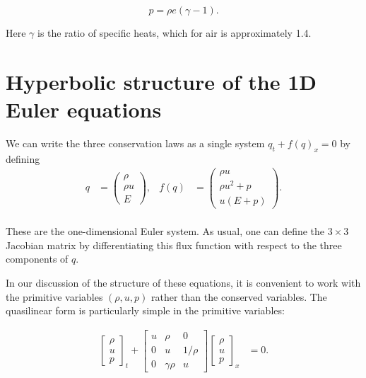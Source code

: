 \documentclass{SIAMbook2016}
\begin{document}
\[p = \rho e (\gamma-1).\]

Here \(\gamma\) is the ratio of specific heats, which for air is
approximately 1.4.

\hypertarget{hyperbolic-structure-of-the-1d-euler-equations}{%
\section{Hyperbolic structure of the 1D Euler
equations}\label{hyperbolic-structure-of-the-1d-euler-equations}}

We can write the three conservation laws as a single system
\(q_t + f(q)_x = 0\) by defining\\
\begin{align}
q & = \begin{pmatrix} \rho \\ \rho u \\ E\end{pmatrix}, & 
f(q) & = \begin{pmatrix} \rho u \\ \rho u^2 + p \\ u(E+p)\end{pmatrix}.
\label{euler_conserved}
\end{align}\\
These are the one-dimensional Euler system. As usual, one can define the
\(3 \times 3\) Jacobian matrix by differentiating this flux function
with respect to the three components of \(q\).

In our discussion of the structure of these equations, it is convenient
to work with the primitive variables \((\rho, u, p)\) rather than the
conserved variables. The quasilinear form is particularly simple in the
primitive variables:

\begin{align} \label{euler_primitive}
\begin{bmatrix} \rho \\ u \\ p \end{bmatrix}_t + 
\begin{bmatrix} u & \rho & 0 \\ 0 & u & 1/\rho \\ 0 & \gamma \rho & u \end{bmatrix} \begin{bmatrix} \rho \\ u \\ p \end{bmatrix}_x & = 0.
\end{align}
\end{document}
